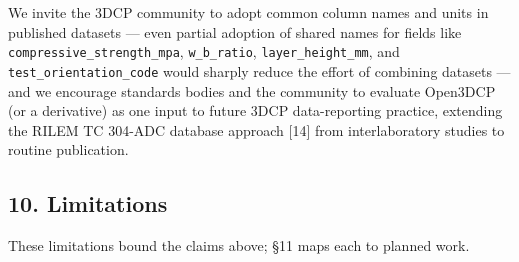 \documentclass[
  11pt,
  letterpaper,
]{article}
\begin{document}
We invite the 3DCP community to adopt common column names and units in
published datasets --- even partial adoption of shared names for fields
like \texttt{compressive\_strength\_mpa}, \texttt{w\_b\_ratio},
\texttt{layer\_height\_mm}, and \texttt{test\_orientation\_code} would
sharply reduce the effort of combining datasets --- and we encourage
standards bodies and the community to evaluate Open3DCP (or a
derivative) as one input to future 3DCP data-reporting practice,
extending the RILEM TC 304-ADC database approach {[}14{]} from
interlaboratory studies to routine publication.

\subsection{10. Limitations}\label{limitations}

These limitations bound the claims above; §11 maps each to planned work.
\end{document}
